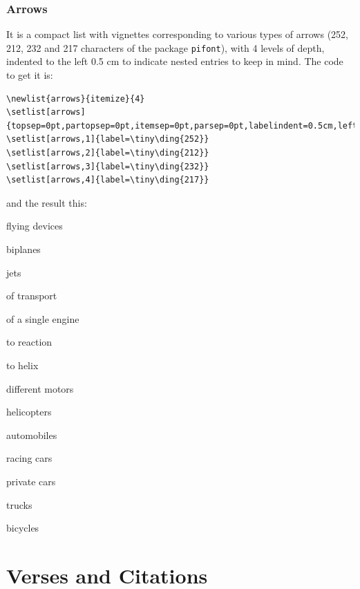 \documentclass[a4paper,
                             twoside,
                             BCOR1.0cm,
                             DIV11,
                             parskip=full,
                             11pt]{scrbook}
\begin{document}
\subsubsection{Arrows}\label{ssbsec:arrows}
It is a compact list with vignettes corresponding to various types of arrows (252, 212, 232 and 217 characters of the package \verb+pifont+), with 4 levels of depth, indented to the left 0.5 cm to indicate nested entries to keep in mind. The code to get it is:
\begin{tiny}
\begin{verbatim}
\newlist{arrows}{itemize}{4}
\setlist[arrows]{topsep=0pt,partopsep=0pt,itemsep=0pt,parsep=0pt,labelindent=0.5cm,leftmargin=*}
\setlist[arrows,1]{label=\tiny\ding{252}}
\setlist[arrows,2]{label=\tiny\ding{212}}
\setlist[arrows,3]{label=\tiny\ding{232}}
\setlist[arrows,4]{label=\tiny\ding{217}}
\end{verbatim}
\end{tiny}
and the result this:

\begin{arrows}
\item flying devices
	\begin{arrows}
		\item biplanes
		\item jets
		\item of transport
			\begin{arrows}
				\item of a single engine
					\begin{arrows}
						\item to reaction
						\item to helix
					\end{arrows}
				\item different motors
			\end{arrows}
		\item helicopters
	\end{arrows}
\item automobiles
	\begin{arrows}
		\item racing cars
		\item private cars
		\item trucks
\end{arrows}
\item bicycles
\end{arrows}

\section{Verses and Citations}\label{sec:quote}
\end{document}

